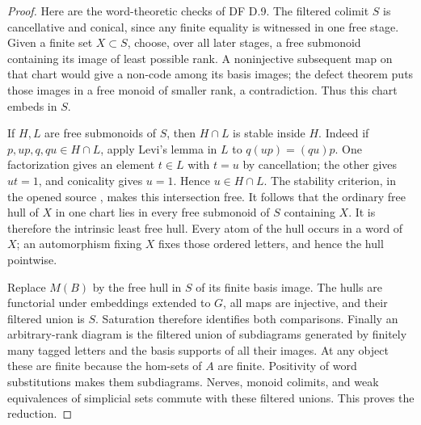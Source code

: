 \begin{proof}
Here are the word-theoretic checks of DF D.9.  The filtered colimit
$S$ is cancellative and conical, since any finite equality is
witnessed in one free stage.  Given a finite set $X\subset S$, choose,
over all later stages, a free submonoid containing its image of
least possible rank.  A noninjective subsequent map on that chart
would give a non-code among its basis images; the defect theorem
\cite[Section 2, Theorems 1--2]{GCastiglione2019} puts those images
in a free monoid of smaller rank, a contradiction.
Thus this chart embeds in $S$.

If $H,L$ are free submonoids of $S$, then $H\cap L$ is stable
inside $H$.  Indeed if $p,up,q,qu\in H\cap L$, apply Levi's lemma
in $L$ to $q(up)=(qu)p$.  One factorization gives an element
$t\in L$ with $t=u$ by cancellation; the other gives $ut=1$,
and conicality gives $u=1$.  Hence $u\in H\cap L$.  The stability
criterion, in the opened source \cite[Theorem 1, p.~84]{GCarpi2014},
makes this intersection free.  It follows that the ordinary free
hull of $X$ in one chart lies in every free submonoid of $S$
containing $X$.  It is therefore the intrinsic least free hull.
Every atom of the hull occurs in a word of $X$; an automorphism
fixing $X$ fixes those ordered letters, and hence the hull pointwise.

Replace $M(B)$ by the free hull in $S$ of its finite basis image.
The hulls are functorial under embeddings extended to $G$, all
maps are injective, and their filtered union is $S$.  Saturation
therefore identifies both comparisons.  Finally an arbitrary-rank
diagram is the filtered union of subdiagrams generated by finitely
many tagged letters and the basis supports of all their images.
At any object these are finite because the hom-sets of $A$ are
finite.  Positivity of word substitutions makes them subdiagrams.
Nerves, monoid colimits, and weak equivalences of simplicial sets
commute with these filtered unions.  This proves the reduction.
\end{proof}

